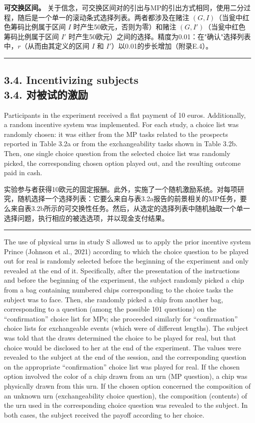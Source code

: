 \documentclass[12pt,a4paper]{article}
\newenvironment{original}
  {\par\vspace{0.5em}\noindent\color{black}\ignorespaces}
  {\par\vspace{0.3em}}
\newenvironment{translation}
  {\par\noindent\color{transblue}\ignorespaces}
  {\par\vspace{0.8em}\hrule\vspace{0.5em}}
\newcommand{\bilingualsubsection}[2]{%
  \subsection{\texorpdfstring{#1 \\[0.2em] {\normalsize\color{transblue}#2}}{#1}}
}
\begin{document}
\begin{translation}
\textbf{可交换区间。} 关于信念，可交换区间对的引出与MP的引出方式相同，使用二分过程，随后是一个单一的滚动条式选择列表。两者都涉及在赌注 $(G, I)$（当瓮中红色筹码比例属于区间 $I$ 时产生50欧元，否则为零）和赌注 $(G, I')$（当瓮中红色筹码比例属于区间 $I'$ 时产生50欧元）之间的选择。精度为0.01：在"确认"选择列表中，$r$（从而由其定义的区间 $I$ 和 $I'$）以0.01的步长增加（附录E.4）。
\end{translation}

\bilingualsubsection{3.4. Incentivizing subjects}{3.4. 对被试的激励}

\begin{original}
Participants in the experiment received a flat payment of 10 euros. Additionally, a random incentive system was implemented. For each study, a choice list was randomly chosen: it was either from the MP tasks related to the prospects reported in Table 3.2a or from the exchangeability tasks shown in Table 3.2b. Then, one single choice question from the selected choice list was randomly picked, the corresponding chosen option played out, and the resulting outcome paid in cash.
\end{original}

\begin{translation}
实验参与者获得10欧元的固定报酬。此外，实施了一个随机激励系统。对每项研究，随机选择一个选择列表：它要么来自与表3.2a报告的前景相关的MP任务，要么来自表3.2b所示的可交换性任务。然后，从选定的选择列表中随机抽取一个单一选择问题，执行相应的被选选项，并以现金支付结果。
\end{translation}

\begin{original}
The use of physical urns in study S allowed us to apply the prior incentive system Prince (Johnson et al., 2021) according to which the choice question to be played out for real is randomly selected before the beginning of the experiment and only revealed at the end of it. Specifically, after the presentation of the instructions and before the beginning of the experiment, the subject randomly picked a chip from a bag containing numbered chips corresponding to the choice tasks the subject was to face. Then, she randomly picked a chip from another bag, corresponding to a question (among the possible 101 questions) on the ``confirmation'' choice list for MPs; she proceeded similarly for ``confirmation'' choice lists for exchangeable events (which were of different lengths). The subject was told that the draws determined the choice to be played for real, but that choice would be disclosed to her at the end of the experiment. The values were revealed to the subject at the end of the session, and the corresponding question on the appropriate ``confirmation'' choice list was played for real. If the chosen option involved the color of a chip drawn from an urn (MP question), a chip was physically drawn from this urn. If the chosen option concerned the composition of an unknown urn (exchangeability choice question), the composition (contents) of the urn used in the corresponding choice question was revealed to the subject. In both cases, the subject received the payoff according to her choice.
\end{original}
\end{document}
